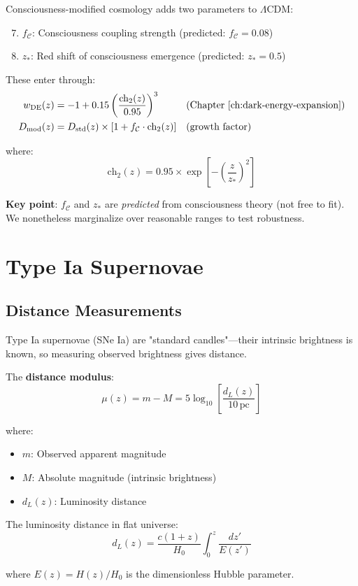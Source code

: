 \begin{defn}\label{def:consciousness-parameters}
Consciousness-modified cosmology adds two parameters to $\Lambda$CDM:
\begin{enumerate}
\setcounter{enumi}{6}
\item $f_{\mathcal{C}}$: Consciousness coupling strength (predicted: $f_{\mathcal{C}} = 0.08$)
\item $z_*$: Red shift of consciousness emergence (predicted: $z_* = 0.5$)
\end{enumerate}

These enter through:
\begin{align}
w_{\text{DE}}(z) &= -1 + 0.15 \left( \frac{\text{ch}_2(z)}{0.95} \right)^3 && \text{(Chapter \ref{ch:dark-energy-expansion})} \\
D_{\text{mod}}(z) &= D_{\text{std}}(z) \times [1 + f_{\mathcal{C}} \cdot \text{ch}_2(z)] && \text{(growth factor)}
\end{align}

where:
\begin{equation}
\text{ch}_2(z) = 0.95 \times \exp\left[ -\left( \frac{z}{z_*} \right)^2 \right]
\end{equation}

\textbf{Key point}: $f_{\mathcal{C}}$ and $z_*$ are \textit{predicted} from consciousness theory (not free to fit). We nonetheless marginalize over reasonable ranges to test robustness.
\end{defn}

\section{Type Ia Supernovae}

\subsection{Distance Measurements}

\begin{level2}
Type Ia supernovae (SNe Ia) are "standard candles"—their intrinsic brightness is known, so measuring observed brightness gives distance\cite{riess1998,perlmutter1999}.

The \textbf{distance modulus}:
\begin{equation}
\mu(z) = m - M = 5 \log_{10}\left[ \frac{d_L(z)}{10 \, \text{pc}} \right]
\end{equation}

where:
\begin{itemize}
\item $m$: Observed apparent magnitude
\item $M$: Absolute magnitude (intrinsic brightness)
\item $d_L(z)$: Luminosity distance
\end{itemize}

The luminosity distance in flat universe:
\begin{equation}
d_L(z) = \frac{c(1+z)}{H_0} \int_0^z \frac{dz'}{E(z')}
\end{equation}

where $E(z) = H(z) / H_0$ is the dimensionless Hubble parameter.
\end{level2}

